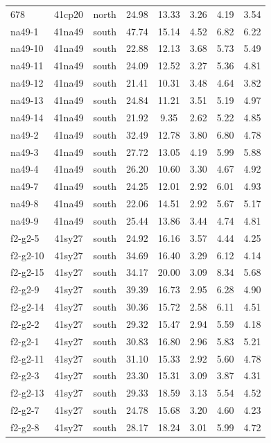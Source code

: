 \documentclass[smallextended]{svjour3}       %
\begin{document}
\begin{longtable}[]{@{}lccccccc@{}}
678 & 41cp20 & north & 24.98 & 13.33 & 3.26 & 4.19 & 3.54 \\
na49-1 & 41na49 & south & 47.74 & 15.14 & 4.52 & 6.82 & 6.22 \\
na49-10 & 41na49 & south & 22.88 & 12.13 & 3.68 & 5.73 & 5.49 \\
na49-11 & 41na49 & south & 24.09 & 12.52 & 3.27 & 5.36 & 4.81 \\
na49-12 & 41na49 & south & 21.41 & 10.31 & 3.48 & 4.64 & 3.82 \\
na49-13 & 41na49 & south & 24.84 & 11.21 & 3.51 & 5.19 & 4.97 \\
na49-14 & 41na49 & south & 21.92 & 9.35 & 2.62 & 5.22 & 4.85 \\
na49-2 & 41na49 & south & 32.49 & 12.78 & 3.80 & 6.80 & 4.78 \\
na49-3 & 41na49 & south & 27.72 & 13.05 & 4.19 & 5.99 & 5.88 \\
na49-4 & 41na49 & south & 26.20 & 10.60 & 3.30 & 4.67 & 4.92 \\
na49-7 & 41na49 & south & 24.25 & 12.01 & 2.92 & 6.01 & 4.93 \\
na49-8 & 41na49 & south & 22.06 & 14.51 & 2.92 & 5.67 & 5.17 \\
na49-9 & 41na49 & south & 25.44 & 13.86 & 3.44 & 4.74 & 4.81 \\
f2-g2-5 & 41sy27 & south & 24.92 & 16.16 & 3.57 & 4.44 & 4.25 \\
f2-g2-10 & 41sy27 & south & 34.69 & 16.40 & 3.29 & 6.12 & 4.14 \\
f2-g2-15 & 41sy27 & south & 34.17 & 20.00 & 3.09 & 8.34 & 5.68 \\
f2-g2-9 & 41sy27 & south & 39.39 & 16.73 & 2.95 & 6.28 & 4.90 \\
f2-g2-14 & 41sy27 & south & 30.36 & 15.72 & 2.58 & 6.11 & 4.51 \\
f2-g2-2 & 41sy27 & south & 29.32 & 15.47 & 2.94 & 5.59 & 4.18 \\
f2-g2-1 & 41sy27 & south & 30.83 & 16.80 & 2.96 & 5.83 & 5.21 \\
f2-g2-11 & 41sy27 & south & 31.10 & 15.33 & 2.92 & 5.60 & 4.78 \\
f2-g2-3 & 41sy27 & south & 23.30 & 15.31 & 3.09 & 3.87 & 4.31 \\
f2-g2-13 & 41sy27 & south & 29.33 & 18.59 & 3.13 & 5.54 & 4.52 \\
f2-g2-7 & 41sy27 & south & 24.78 & 15.68 & 3.20 & 4.60 & 4.23 \\
f2-g2-8 & 41sy27 & south & 28.17 & 18.24 & 3.01 & 5.99 & 4.72 \\

\end{longtable}
\end{document}
